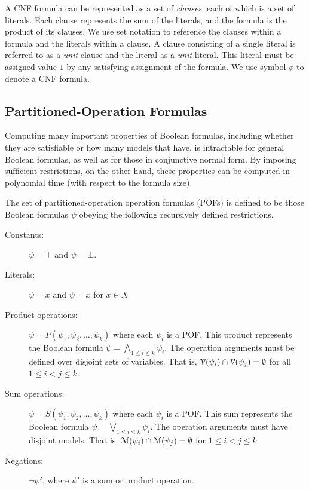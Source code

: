 \documentclass[letterpaper,USenglish,cleveref, autoref, thm-restate]{lipics-v2021}
\newcommand{\tautology}{\top}
\newcommand{\nil}{\bot}
\newcommand{\obar}[1]{\overline{#1}}
\newcommand{\varset}{X}
\newcommand{\dependencyset}{{\cal V}}
\newcommand{\modelset}{{\cal M}}
\begin{document}
  A CNF
  formula can be represented as a set of \emph{clauses}, each of which is a
  set of literals.  Each clause represents the sum of the
  literals, and the formula is the product of its clauses.  We use
  set notation to reference the clauses within a formula and the
  literals within a clause.  A clause consisting of a single literal is referred to as a \emph{unit} clause and the literal as a \emph{unit} literal.
This literal must be assigned value $1$ by any satisfying assignment of the formula.  We use symbol $\phi$ to denote a CNF formula.

\subsection{Partitioned-Operation Formulas}

Computing many important properties of Boolean formulas, including
whether they are satisfiable or how many models that have, is
intractable for general Boolean formulas, as well as for those in
conjunctive normal form.  By imposing sufficient restrictions, on the
other hand, these properties can be computed in polynomial time (with
respect to the formula size).

The set of partitioned-operation operation formulas (POFs) is defined to be those Boolean formulas $\psi$ obeying the following recursively defined restrictions.
\begin{description}
\item[Constants:] 
$\psi = \tautology$ and $\psi = \nil$.
 \item[Literals:]
   $\psi = x$ and $\psi = \obar{x}$ for $x \in \varset$
 \item[Product operations:] $\psi = P(\psi_1, \psi_2, \ldots, \psi_k)$ where each $\psi_i$ is a POF\@.
   This product represents the Boolean formula
   $\psi = \bigwedge_{1 \leq i \leq k} \psi_i$.
 The operation arguments must be defined over disjoint sets of variables.
 That is, $\dependencyset(\psi_i) \cap \dependencyset(\psi_j) = \emptyset$ for all $1 \leq i < j \leq k$.
 \item[Sum operations:] $\psi = S(\psi_1, \psi_2, \ldots, \psi_k)$ where each $\psi_i$ is a POF\@.
   This sum represents the Boolean formula
   $\psi = \bigvee_{1 \leq i \leq k} \psi_i$.
The operation arguments must have disjoint models.
That is, $\modelset(\psi_i) \cap \modelset(\psi_j) = \emptyset$ for $1 \leq i < j \leq k$.
\item[Negations:] $\neg \psi'$, where $\psi'$ is a sum or product operation.
\end{description}
\end{document}

